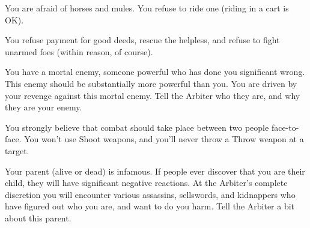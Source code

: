 {    

    You are afraid of horses and mules.  You refuse to ride one (riding in a cart is OK).



    You refuse payment for good deeds, rescue the helpless, and refuse to fight unarmed foes (within reason, of course).  


    You have a mortal enemy, someone powerful who has done you significant wrong.  This enemy should be substantially more powerful than you.  You are driven by your revenge against this mortal enemy. Tell the Arbiter who they are, and why they are your enemy.


    You strongly believe that combat should take place between two people face-to-face.  You won't use Shoot weapons, and you'll never throw a Throw weapon at a target.


    Your parent (alive or dead) is infamous.  If people ever discover that you are their child, they will have significant negative reactions.  At the Arbiter's complete discretion you will encounter various assassins, sellswords, and kidnappers who have figured out who you are, and want to do you harm.  Tell the Arbiter a bit about this parent.







}
